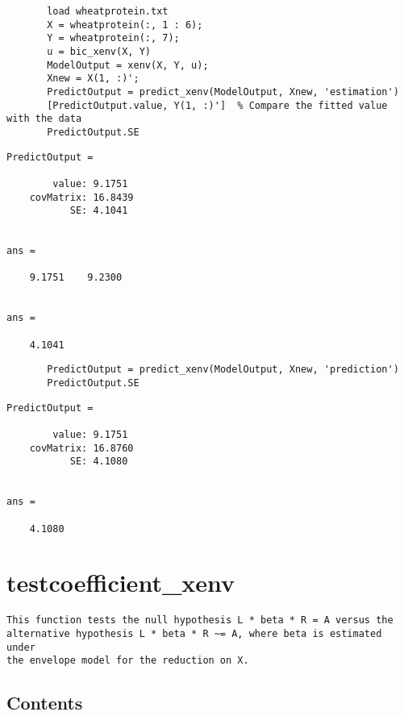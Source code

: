 \documentclass[a4paper,11pt,openany]{memoir}
\begin{document}
\begin{verbatim}       load wheatprotein.txt
       X = wheatprotein(:, 1 : 6);
       Y = wheatprotein(:, 7);
       u = bic_xenv(X, Y)
       ModelOutput = xenv(X, Y, u);
       Xnew = X(1, :)';
       PredictOutput = predict_xenv(ModelOutput, Xnew, 'estimation')
       [PredictOutput.value, Y(1, :)']  % Compare the fitted value with the data
       PredictOutput.SE\end{verbatim}
        \color{lightgray}\ttfamily \begin{verbatim}
PredictOutput = 

        value: 9.1751
    covMatrix: 16.8439
           SE: 4.1041


ans =

    9.1751    9.2300


ans =

    4.1041
\end{verbatim} \rmfamily
\color{black}
       
       \begin{verbatim}
       PredictOutput = predict_xenv(ModelOutput, Xnew, 'prediction')
       PredictOutput.SE\end{verbatim}

\color{lightgray}\ttfamily \begin{verbatim}
PredictOutput = 

        value: 9.1751
    covMatrix: 16.8760
           SE: 4.1080


ans =

    4.1080

\end{verbatim} \rmfamily
\color{black}

\newpage

\rmfamily
\color{black}\section{testcoefficient\_xenv}


\begin{verbatim}This function tests the null hypothesis L * beta * R = A versus the
alternative hypothesis L * beta * R ~= A, where beta is estimated under
the envelope model for the reduction on X.\end{verbatim}
    
\subsection*{Contents}
\end{document}
